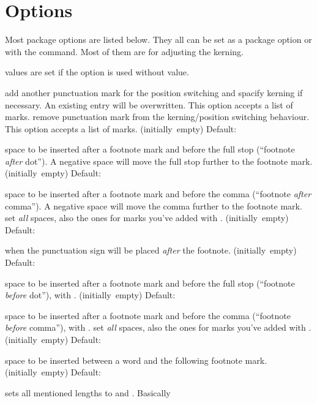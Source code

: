 \documentclass[toc=index,toc=bib]{cnpkgdoc}
\newcommand*\Default[1]{%
  \hfill\llap
    {%
      \ifblank{#1}%
        {(initially~empty)}%
        {Default:~\code{#1}}%
    }%
  \newline
}
\begin{document}
\section{Options}\label{sec:options}
Most package options are listed below. They all can be set as a package option or
with the  command. Most of them are for adjusting the kerning.

 values are set if the option is used without value.
\begin{beschreibung}
 \newline
   add another punctuation mark for the position switching and spacify kerning
   if necessary. An existing entry will be overwritten. This option accepts a
   list of marks.
 \newline
   remove punctuation mark from the kerning/position switching behaviour. This
   option accepts a list of marks.
 \Default{-.06em}
   space to be inserted after a footnote mark and before the full stop
   (``footnote \emph{after} dot''). A negative space will move the full stop
   further to the footnote mark.
 \Default{-.06em}
   space to be inserted after a footnote mark and before the comma
   (``footnote \emph{after} comma''). A negative space will move the comma further
   to the footnote mark.
 \newline
   set \emph{all} spaces, \ie also the ones for marks you've added with
   .
 \Default{false}
   when  the punctuation sign will be placed \emph{after} the footnote.
 \Default{-.16em}
   space to be inserted after a footnote mark and before the full stop (``footnote
   \emph{before} dot''), \ie with .
 \Default{-.16em}
   space to be inserted after a footnote mark and before the comma (``footnote
   \emph{before} comma''), \ie with .
 \newline
   set \emph{all} spaces, \ie also the ones for marks you've added with
   .
 \Default{.06em}
   space to be inserted between a word and the following footnote mark.
 \Default{false}
   sets all mentioned lengths to \code{0pt} and . Basically

\end{beschreibung}
\end{document}
